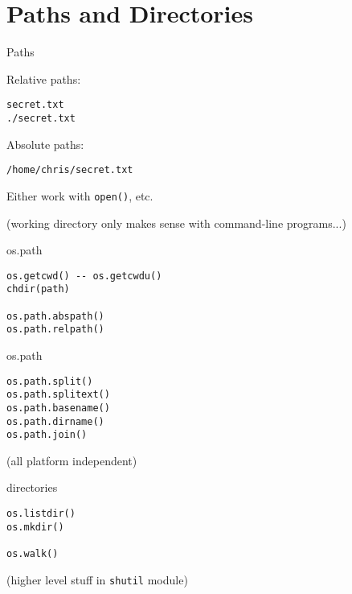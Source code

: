 \documentclass{beamer}
\begin{document}
\section{Paths and Directories}

\begin{frame}[fragile]{Paths}

{\Large Relative paths:}

\begin{verbatim}
secret.txt
./secret.txt
\end{verbatim}

{\Large Absolute paths:}
\begin{verbatim}
/home/chris/secret.txt
\end{verbatim}

{\Large Either work with \verb|open()|, etc.}

\vfill
(working directory only makes sense with command-line programs...)
\end{frame}

\begin{frame}[fragile]{os.path}

\begin{verbatim}
os.getcwd() -- os.getcwdu()
chdir(path)

os.path.abspath()
os.path.relpath()￼
\end{verbatim}

\end{frame}

\begin{frame}[fragile]{os.path}

\vfill
\begin{verbatim}
os.path.split()
os.path.splitext()
os.path.basename()
os.path.dirname()
os.path.join()
\end{verbatim}

\vfill
(all platform independent)

\end{frame}


\begin{frame}[fragile]{directories}

\vfill
\begin{verbatim}
os.listdir()
os.mkdir()

os.walk()

\end{verbatim}

\vfill
(higher level stuff in \verb|shutil| module)

\end{frame}
\end{document}
